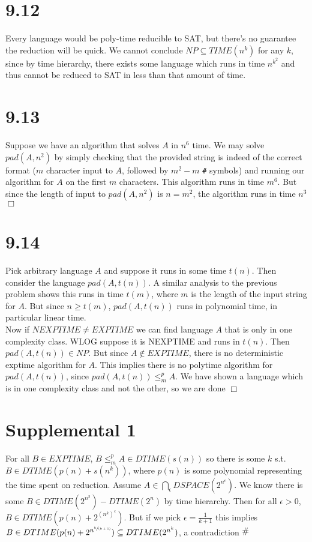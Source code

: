 \documentclass{article}
\newcommand{\contra}{\raisebox{\depth}{\#}}
\begin{document}
\section*{9.12}
Every language would be poly-time reducible to SAT, but there's no guarantee the reduction will be quick. We cannot conclude $NP \subseteq TIME(n^k)$ for any $k$, since by time hierarchy, there exists some language which runs in time $n^{k^2}$ and thus cannot be reduced to SAT in less than that amount of time.

\section*{9.13}
Suppose we have an algorithm that solves $A$ in $n^6$ time. We may solve $pad(A,n^2)$ by simply checking that the provided string is indeed of the correct format ($m$ character input to $A$, followed by $m^2-m$ \verb|#| symbols) and running our algorithm for $A$ on the first $m$ characters. This algorithm runs in time $m^6$. But since the length of input to $pad(A,n^2)$ is $n = m^2$, the algorithm runs in time $n^3$ $\Box$

\section*{9.14}
Pick arbitrary language $A$ and suppose it runs in some time $t(n)$. Then consider the language $pad(A,t(n))$. A similar analysis to the previous problem shows this runs in time $t(m)$, where $m$ is the length of the input string for $A$. But since $n \geqslant t(m)$, $pad(A,t(n))$ runs in polynomial time, in particular linear time.\\
Now if $NEXPTIME \neq EXPTIME$ we can find language $A$ that is only in one complexity class. WLOG suppose it is NEXPTIME and runs in $t(n)$. Then $pad(A,t(n)) \in NP$. But since $A \notin EXPTIME$, there is no deterministic exptime algorithm for $A$. This implies there is no polytime algorithm for $pad(A,t(n))$, since $pad(A,t(n)) \leqslant_m^p A$. We have shown a language which is in one complexity class and not the other, so we are done $\Box$

\section*{Supplemental 1}
For all $B \in EXPTIME$, $B \leqslant_m^p A \in DTIME(s(n))$ so there is some $k$ s.t. $B \in DTIME(p(n) + s(n^k))$, where $p(n)$ is some polynomial representing the time spent on reduction. Assume $A \in \bigcap_\epsilon DSPACE(2^{n^\epsilon})$. We know there is some $B \in DTIME(2^{n^2}) - DTIME(2^{n})$ by time hierarchy. Then for all $\epsilon > 0$, $B \in DTIME(p(n) + 2^{(n^k)^\epsilon})$. But if we pick $\epsilon = \frac{1}{k+1}$ this implies $B \in DTIME(p(n)+2^{n^{\sfrac{k}{(k+1)}}}) \subseteq DTIME(2^{n^k})$, a contradiction $\contra$
\end{document}

